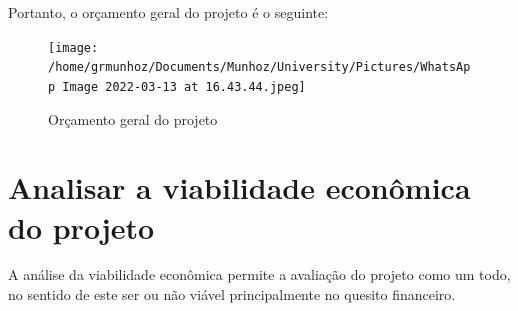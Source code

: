 \documentclass[
	12pt,				%
	openright,			%
	oneside,			%
	a4paper,			%
	english,			%
	french,				%
	spanish,			%
	brazil				%
	]{abntex2}
\begin{document}
Portanto, o orçamento geral do projeto é o seguinte:

\begin{figure}[H]
\begin{center}
\caption{Orçamento geral do projeto}
\texttt{[image: /home/grmunhoz/Documents/Munhoz/University/Pictures/WhatsApp Image 2022-03-13 at 16.43.44.jpeg]} 
\end{center}
\end{figure}	

\section{Analisar a viabilidade econômica do projeto}

A análise da viabilidade econômica permite a avaliação do projeto como um todo, no sentido de este ser ou não viável principalmente no quesito financeiro.
\end{document}
